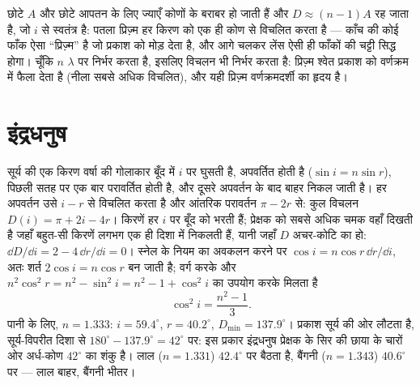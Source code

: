 \begin{remark}\label{rem:b1:rays-reflection-refraction:thin}
छोटे $A$ और छोटे आपतन के लिए ज्याएँ कोणों के बराबर हो जाती हैं और
$D \approx (n - 1)A$ रह जाता है, जो $i$ से स्वतंत्र है: पतला प्रिज़्म हर किरण
को एक ही कोण से विचलित करता है --- काँच की कोई फाँक ऐसा ``प्रिज़्म'' है जो
प्रकाश को मोड़ देता है, और आगे चलकर लेंस ऐसी ही फाँकों की चट्टी सिद्ध होगा।
चूँकि $n$ $\lambda$ पर निर्भर करता है, इसलिए विचलन भी निर्भर करता है: प्रिज़्म
श्वेत प्रकाश को वर्णक्रम में फैला देता है (नीला सबसे अधिक विचलित), और यही
प्रिज़्म वर्णक्रमदर्शी का हृदय है।
\end{remark}

\section{इंद्रधनुष}

\begin{example}[देकार्त का इंद्रधनुष]\label{ex:b1:rays-reflection-refraction:rainbow}
सूर्य की एक किरण वर्षा की गोलाकार बूँद में  $i$ पर घुसती है, अपवर्तित
होती है ($\sin i = n\sin r$), पिछली सतह पर एक बार परावर्तित होती है, और दूसरे
अपवर्तन के बाद बाहर निकल जाती है। हर अपवर्तन उसे $i - r$ से विचलित करता है
और आंतरिक परावर्तन $\pi - 2r$ से: कुल विचलन
$D(i) = \pi + 2i - 4r$। किरणें हर $i$ पर बूँद को भरती हैं; प्रेक्षक को सबसे
अधिक चमक वहाँ दिखती है जहाँ बहुत-सी किरणें लगभग एक ही दिशा में निकलती हैं,
यानी जहाँ $D$ अचर-कोटि का हो: $\dd D/\dd i = 2 - 4\,\dd r/\dd i
= 0$। स्नेल के नियम का अवकलन करने पर $\cos i = n\cos r\,\dd r/\dd i$, अतः
शर्त $2\cos i = n\cos r$ बन जाती है; वर्ग करके और
$n^2\cos^2 r = n^2 - \sin^2 i = n^2 - 1 + \cos^2 i$ का उपयोग करके मिलता है
\[
\cos^2 i = \frac{n^2 - 1}{3} .
\]
पानी के लिए, $n = 1.333$: $i = 59.4^\circ$, $r = 40.2^\circ$,
$D_{\min} = 137.9^\circ$। प्रकाश सूर्य की ओर लौटता है, सूर्य-विपरीत दिशा से
$180^\circ - 137.9^\circ = 42^\circ$ पर: इस प्रकार इंद्रधनुष प्रेक्षक के सिर
की छाया के चारों ओर अर्ध-कोण $42^\circ$ का शंकु है। लाल ($n = 1.331$)
$42.4^\circ$ पर बैठता है, बैंगनी ($n = 1.343$) $40.6^\circ$ पर --- लाल बाहर,
बैंगनी भीतर।
\end{example}

